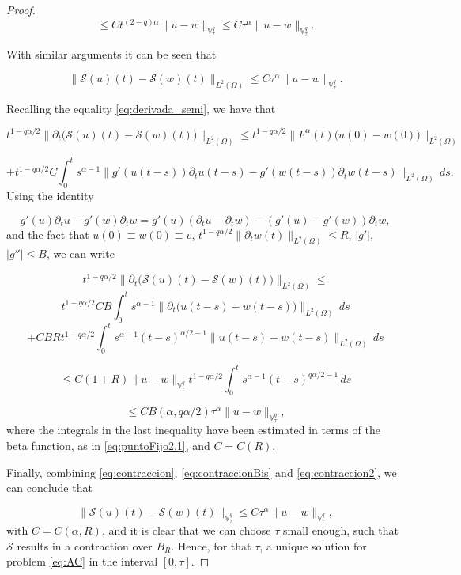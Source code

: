 \documentclass{amsart}
\newcommand{\ele}{L^2(\Omega)}
\newcommand{\fmonio}{g}
\newcommand{\V}{\mathbb{V}^q}
\theoremstyle{remark}
\theoremstyle{definition}
\numberwithin{equation}{section}
\begin{document}
\begin{proof}
$$ \leq Ct^{(2-q)\alpha} \|u - w\|_{\V_{\tau}} \leq C\tau^{\alpha} \|u - w\|_{\V_{\tau}}.$$
  

With similar arguments it can be seen that

\begin{equation}
\label{eq:contraccionBis}
\|\mathcal{S}(u)(t) - \mathcal{S}(w)(t)  \|_{\ele} \leq C \tau^{\alpha}\|u - w\|_{\V_{\tau}}.
\end{equation}

Recalling the equality \eqref{eq:derivada_semi}, we have that 

$$
 t^{1-q\alpha/2}\|\partial_t \big( \mathcal{S}(u)(t) - \mathcal{S}(w)(t)  \big) \|_{\ele} \leq t^{1-q\alpha/2}\|F^{\alpha}(t)\big(u(0) - w(0)\big)\|_{\ele} 
$$

$$+t^{1-q\alpha/2}C\int^{t}_0 s^{\alpha - 1}\|\fmonio'(u(t-s))\partial_t u(t-s) - \fmonio'(w(t-s))\partial_t w(t-s)\|_{\ele}\,ds. $$
Using the identity

$$\fmonio'(u)\partial_t u - \fmonio'(w)\partial_t w = \fmonio'(u)(\partial_t u - \partial_t w)  - (\fmonio'(u) - \fmonio'(w)) \partial_t w,$$
and the fact that $u(0)\equiv w(0) \equiv v$, $t^{1-q\alpha/2}\|\partial_t w(t)\|_{\ele} \leq R$, $|\fmonio'|$, $|\fmonio''| \leq B$, we can write 

\begin{equation}
\label{eq:contraccion2}
t^{1-q\alpha/2}\|\partial_t \big( \mathcal{S}(u)(t) - \mathcal{S}(w)(t)  \big) \|_{\ele} \leq
\end{equation}
$$
 t^{1-q\alpha/2}CB\int^{t}_0 s^{\alpha - 1} \|\partial_t\big( u(t-s)- w(t-s) \big) \|_{\ele} \,ds
$$
$$+ CBRt^{1-q\alpha/2}\int^{t}_0 s^{\alpha - 1} (t-s)^{\alpha/2-1}\|u(t-s)- w(t-s) \|_{\ele} \,ds$$

$$\leq C(1+R) \|u-w\|_{\V_{\tau}} t^{1-q\alpha/2}\int^{t}_0 s^{\alpha - 1} (t-s)^{q\alpha/2-1} \,ds$$

$$ \leq  C B(\alpha,q\alpha/2)\tau^{\alpha}\|u-w\|_{\V_{\tau}},$$
where the integrals in the last inequality have been estimated in terms of the beta function, as in \eqref{eq:puntoFijo2.1}, and $C=C(R)$.


Finally, combining \eqref{eq:contraccion}, \eqref{eq:contraccionBis} and \eqref{eq:contraccion2}, we can conclude that 

$$\|\mathcal{S}(u)(t) - \mathcal{S}(w)(t)  \|_{\V_{\tau}} \leq  C\tau^{\alpha}\|u-w\|_{\V_{\tau}}, $$ 
with $C=C(\alpha,R)$, and it is clear that we can choose $\tau$ small enough, such that $\mathcal{S}$ results in a contraction over $B_{R}$. Hence, for that $\tau$,  a unique solution for problem \eqref{eq:AC} in the interval $[0,\tau]$.   \end{proof}
\end{document}
